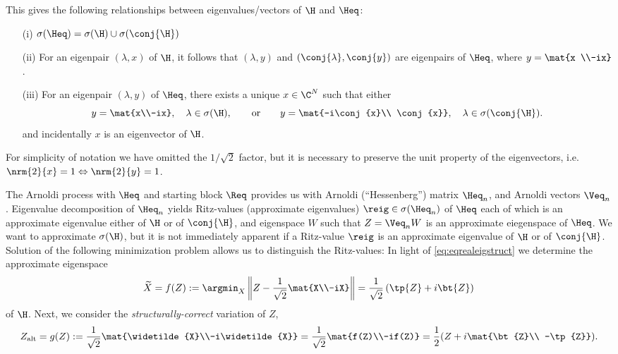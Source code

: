 This gives the following relationships between eigenvalues/vectors of $\H$
and $\Heq$:
\begin{itemize}
	\item[(i)] $\sigma(\Heq) = \sigma(\H) \cup \sigma(\conj{\H})$
	\item[(ii)] For an eigenpair $(\lambda,x)$ of $\H$, it follows that  $(\lambda,y)$ and
		$(\conj{\lambda},\conj{y})$ are eigenpairs of $\Heq$, where $y=\mat{x \\-ix}$.
	\item[(iii)] For an eigenpair $(\lambda,y)$ of $\Heq$, there exists a unique
	$x\in\C^N$ such that either
	\[  y = \mat{x\\-ix}, \quad \lambda \in\sigma(\H), \qquad\text{or}\qquad
		y = \mat{-i\conj{x}\\ \conj{x}},\quad  \lambda \in\sigma(\conj{\H}).
	\]
		and incidentally $x$ is an eigenvector of $\H$.
\end{itemize}
For simplicity of notation we have omitted the $1/\sqrt{2}$ factor, but it is necessary
to preserve the unit property of the eigenvectors,
i.e. $\nrm{2}{x}=1 \Leftrightarrow \nrm{2}{y}=1$.

The Arnoldi process with $\Heq$ and starting block $\Req$ provides us with
 Arnoldi (``Hessenberg'') matrix $\Heq_n$, and Arnoldi vectors $\Veq_n$.
Eigenvalue decomposition of $\Heq_n$ yields Ritz-values (approximate eigenvalues)
$\reig\in\sigma(\Heq_n)$
of $\Heq$ each of which is an approximate eigenvalue
either of $\H$ or of $\conj{\H}$,
and eigenspace $W$ such that $Z=\Veq_n W$ is an approximate eiegenspace of
$\Heq$.  We want to approximate $\sigma(\H)$, but it is not
immediately apparent if a Ritz-value $\reig$ is an approximate eigenvalue of $\H$ or of
$\conj{\H}$. Solution of the following minimization problem allows us to distinguish the
Ritz-values:
In light of \eqref{eq:eqrealeigstruct} we determine the approximate
eigenspace
\begin{equation}
\widetilde{X} = f(Z) := \argmin_X\left\| Z - \frac{1}{\sqrt{2}}\mat{X\\-iX} \right\|
= \frac{1}{\sqrt{2}}\left(\tp{Z}+i\bt{Z}\right)
\label{eq:minslvX}
\end{equation}
of $\H$. Next, we consider the \emph{structurally-correct} variation of $Z$,
\begin{equation}
 	Z_{\text{alt}} = g(Z) := \frac{1}{\sqrt{2}}\mat{\widetilde{X}\\-i\widetilde{X}}
 	 = \frac{1}{\sqrt{2}}\mat{f(Z)\\-if(Z)}
 	= \frac{1}{2}(Z+i\mat{\bt{Z}\\ -\tp{Z}})
 	.
 \label{eq:Zalt}
\end{equation}

